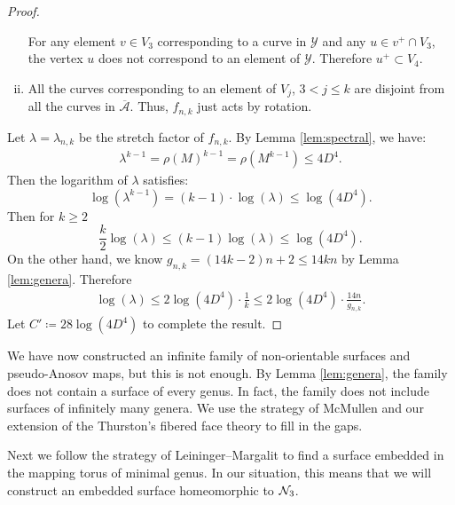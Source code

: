\begin{proof}
\begin{enumerate}[(i)]
  For any element $v \in V_3$ corresponding to a curve in $\mathcal{Y}$ and any
  $u \in v^+ \cap V_3$, the vertex $u$ does not correspond to an element of $\mathcal{Y}$.  Therefore $u^+ \subset V_4$.
\item All the curves corresponding to an element of $V_j$, $3 < j \leq k$ are disjoint from all the curves in
  $\overline{\mathcal{A}}$. Thus, $f_{n,k}$ just acts by rotation.
\end{enumerate}

Let $\lambda = \lambda_{n,k}$ be the stretch factor of $f_{n,k}$.  By Lemma \ref{lem:spectral}, we have:
\begin{gather*}
    \lambda^{k-1} = \rho(M)^{k-1} = \rho(M^{k-1}) \leq 4D^4. 
\end{gather*}
Then the logarithm of $\lambda$ satisfies:
$$\log(\lambda^{k-1})=(k-1)\cdot \log(\lambda) \leq \log(4D^4).$$
Then for $k\geq 2$
    $$\frac{k}{2}\log(\lambda) \leq (k-1)\log(\lambda) \leq \log(4D^4).$$
On the other hand, we know $g_{n,k} = (14k - 2)n + 2 \leq 14kn$ by Lemma \ref{lem:genera}. Therefore
\begin{align*}
    \log(\lambda) \leq 2\log(4D^4)\cdot\frac{1}{k} \leq 2\log(4D^4)\cdot \frac{14n}{g_{n,k}}.
\end{align*}
Let $C' \coloneqq 28\log(4D^4)$ to complete the result.
\end{proof}


We have now constructed an infinite family of non-orientable surfaces and pseudo-Anosov maps, but this is not
enough. By Lemma \ref{lem:genera}, the family does not contain a surface of every genus. In fact, the family does not include surfaces of infinitely many genera. We use the strategy of McMullen \cite{mcmullen2000polynomial} and our extension of the Thurston's
fibered face theory to fill in the gaps. %

Next we follow the strategy of Leininger--Margalit \cite{leininger2013number} to find a surface embedded in the mapping torus of minimal genus.  In our situation, this means that we will construct an embedded surface homeomorphic to $\mathcal{N}_3$.

